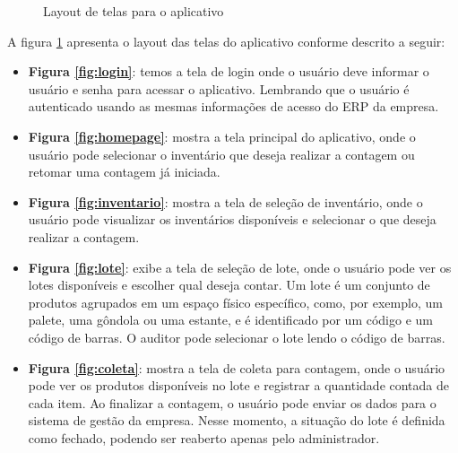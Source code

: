 \begin{figure}[t]
{    }
    \quad
    \label{fig:grupo01}
    \caption{Layout de telas para o aplicativo}
\label{fig:telas}
\end{figure}

A figura \ref{fig:telas} apresenta o layout das telas do aplicativo conforme descrito a seguir:

\begin{itemize}
    \item \textbf{Figura \ref{fig:login}}: temos a tela de login onde o usuário deve informar o usuário e senha para acessar o aplicativo. Lembrando que o usuário é autenticado usando as mesmas informações de acesso do ERP da empresa.
    \item \textbf{Figura \ref{fig:homepage}}: mostra a tela principal do aplicativo, onde o usuário pode selecionar o inventário que deseja realizar a contagem ou retomar uma contagem já iniciada. 
    \item \textbf{Figura \ref{fig:inventario}}: mostra a tela de seleção de inventário, onde o usuário pode visualizar os inventários disponíveis e selecionar o que deseja realizar a contagem. 
    \item \textbf{Figura \ref{fig:lote}}: exibe a tela de seleção de lote, onde o usuário pode ver os lotes disponíveis e escolher qual deseja contar. Um lote é um conjunto de produtos agrupados em um espaço físico específico, como, por exemplo, um palete, uma gôndola ou uma estante, e é identificado por um código e um código de barras. O auditor pode selecionar o lote lendo o código de barras.
    \item \textbf{Figura \ref{fig:coleta}}: mostra a tela de coleta para contagem, onde o usuário pode ver os produtos disponíveis no lote e registrar a quantidade contada de cada item. Ao finalizar a contagem, o usuário pode enviar os dados para o sistema de gestão da empresa. Nesse momento, a situação do lote é definida como fechado, podendo ser reaberto apenas pelo administrador.
\end{itemize}

